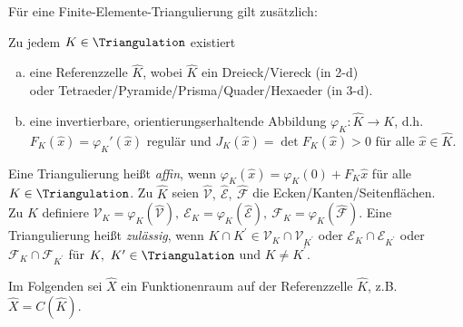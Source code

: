 \begin{Definition}
    \label{def:4.2}
    Für eine Finite-Elemente-Triangulierung gilt zusätzlich:
    
    Zu jedem $K\in \Triangulation$ existiert
    \begin{enumerate}[a)]
        \item
          eine Referenzzelle $\hat K$, wobei $\hat K$ ein Dreieck/Viereck
          (in 2-d) \\
          oder Tetraeder/Pyramide/Prisma/Quader/Hexaeder (in 3-d).
        \item
          eine invertierbare, orientierungserhaltende Abbildung $\varphi_K:
          \hat K \to K$, d.h. $F_K(\hat{x}) = \varphi_K'(\hat{x})$ regulär und
          $J_K(\hat{x}) = \det F_K(\hat{x}) > 0$ für alle $\hat x \in \hat K$.
    \end{enumerate}
    Eine Triangulierung heißt \emph{affin}, wenn
    $\varphi_K(\hat x) = \varphi_K(0) + F_K \hat x$ für alle $K\in
    \Triangulation$. Zu $\hat K$ seien $\hat{\mathcal{V}}, \ \hat{\mathcal{E}}, \
    \hat{\mathcal{F}}$ die Ecken/Kanten/Seitenflächen. \\
    Zu $K$ definiere $\mathcal{V}_K = \varphi_K(\hat{\mathcal{V}}), \
    \mathcal{E}_K = \varphi_K(\hat{\mathcal{E}}), \ \mathcal{F}_K =
    \varphi_K(\hat{\mathcal{F}})$.
    Eine Triangulierung heißt \emph{zulässig}, wenn
    $K \cap K^\prime \in \mathcal{V}_K \cap \mathcal{V}_{K^\prime}$ oder
    $\mathcal{E}_K \cap \mathcal{E}_{K^\prime}$ oder
    $\mathcal{F}_K \cap \mathcal{F}_{K^\prime}$ für $K, \ K^\prime \in
    \Triangulation$ und $K \neq K^\prime$.
\end{Definition}

Im Folgenden sei $\hat{X}$ ein Funktionenraum auf der Referenzzelle $\hat{K}$, z.B. $\hat{X} = C(\hat{K})$.

